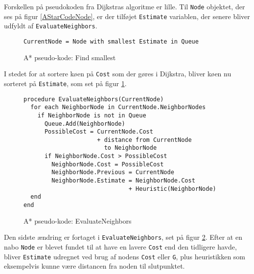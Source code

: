 Forskellen på pseudokoden fra Dijkstras algoritme er lille. Til \texttt{Node} objektet, der ses på figur \ref{AStarCodeNode}, er der tilføjet \texttt{Estimate} variablen, der senere bliver udfyldt af \texttt{EvaluateNeighbors}.

\begin{figure}[H]
\begin{lstlisting}
CurrentNode = Node with smallest Estimate in Queue
\end{lstlisting}
\caption{A* pseudo-kode: Find smallest}\label{AStarCodeFindSmallest}
\end{figure}

I stedet for at sortere køen på \texttt{Cost} som der gøres i Dijkstra, bliver køen nu sorteret på \texttt{Estimate}, som set på figur \ref{AStarCodeFindSmallest}.

\begin{figure}[H]
\begin{lstlisting}
procedure EvaluateNeighbors(CurrentNode)
  for each NeighborNode in CurrentNode.NeighborNodes
    if NeighborNode is not in Queue
      Queue.Add(NeighborNode)
      PossibleCost = CurrentNode.Cost 
                     + distance from CurrentNode
                       to NeighborNode
      if NeighborNode.Cost > PossibleCost
        NeighborNode.Cost = PossibleCost
        NeighborNode.Previous = CurrentNode
        NeighborNode.Estimate = NeighborNode.Cost
                              + Heuristic(NeighborNode)
  end
end
\end{lstlisting}
\caption{A* pseudo-kode: EvaluateNeighbors}\label{AStarCodeEvaluateNeighbors}
\end{figure}

Den sidste ændring er fortaget i \texttt{EvaluateNeighbors}, set på figur \ref{AStarCodeEvaluateNeighbors}. Efter at en nabo \texttt{Node} er blevet fundet til at have en lavere \texttt{Cost} end den tidligere havde, bliver \texttt{Estimate} udregnet ved brug af nodens \texttt{Cost} eller \texttt{G}, plus heuristikken som eksempelvis kunne være distancen fra noden til slutpunktet.